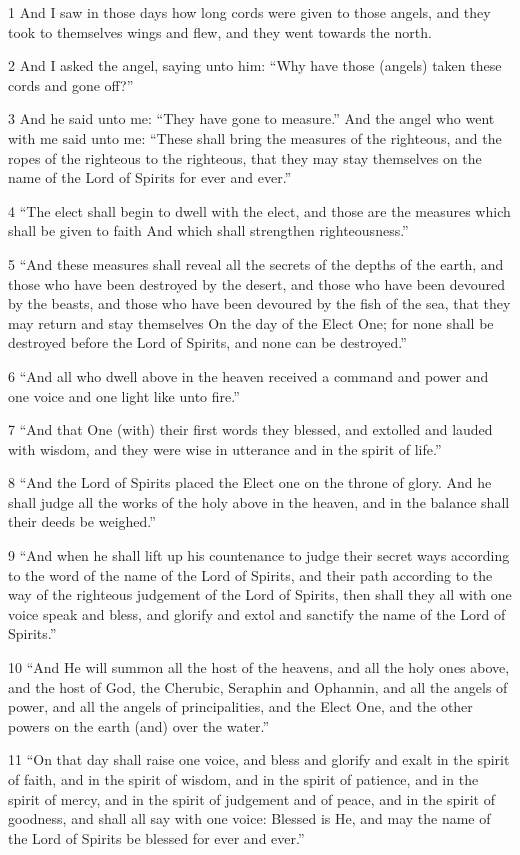 \par 1 And I saw in those days how long cords were given to those angels, and they took to themselves wings and flew, and they went towards the north.
\par 2 And I asked the angel, saying unto him: “Why have those (angels) taken these cords and gone off?”
\par 3 And he said unto me: “They have gone to measure.” And the angel who went with me said unto me: “These shall bring the measures of the righteous, and the ropes of the righteous to the righteous, that they may stay themselves on the name of the Lord of Spirits for ever and ever.”
\par 4 “The elect shall begin to dwell with the elect, and those are the measures which shall be given to faith And which shall strengthen righteousness.”
\par 5 “And these measures shall reveal all the secrets of the depths of the earth, and those who have been destroyed by the desert, and those who have been devoured by the beasts, and those who have been devoured by the fish of the sea, that they may return and stay themselves On the day of the Elect One; for none shall be destroyed before the Lord of Spirits, and none can be destroyed.”
\par 6 “And all who dwell above in the heaven received a command and power and one voice and one light like unto fire.”
\par 7 “And that One (with) their first words they blessed, and extolled and lauded with wisdom, and they were wise in utterance and in the spirit of life.”
\par 8 “And the Lord of Spirits placed the Elect one on the throne of glory. And he shall judge all the works of the holy above in the heaven, and in the balance shall their deeds be weighed.”
\par 9 “And when he shall lift up his countenance to judge their secret ways according to the word of the name of the Lord of Spirits, and their path according to the way of the righteous judgement of the Lord of Spirits, then shall they all with one voice speak and bless, and glorify and extol and sanctify the name of the Lord of Spirits.”
\par 10 “And He will summon all the host of the heavens, and all the holy ones above, and the host of God, the Cherubic, Seraphin and Ophannin, and all the angels of power, and all the angels of principalities, and the Elect One, and the other powers on the earth (and) over the water.”
\par 11 “On that day shall raise one voice, and bless and glorify and exalt in the spirit of faith, and in the spirit of wisdom, and in the spirit of patience, and in the spirit of mercy, and in the spirit of judgement and of peace, and in the spirit of goodness, and shall all say with one voice: Blessed is He, and may the name of the Lord of Spirits be blessed for ever and ever.”
